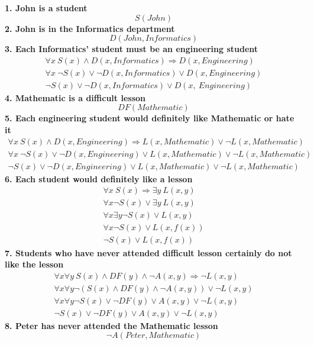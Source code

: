 \documentclass[a4paper, 12pt]{article}
\newcommand{\bd}{\textbf}
\begin{document}
\bd{1. John is a student}
$$
    S(John)
$$
\bd{2. John is in the Informatics department}
$$
    D(John, Informatics)
$$
\bd{3. Each Informatics' student must be an engineering student}
\begin{align*}
    \forall{x}\ S(x)\land D(x,Informatics)\Rightarrow D(x,Engineering)       \\
    \forall{x}\ \lnot S(x) \lor \lnot D(x,Informatics) \lor D(x,Engineering) \\
    \lnot S(x) \lor \lnot D(x,Informatics) \lor D(x,\ Engineering)
\end{align*}
\bd{4. Mathematic is a difficult lesson}
$$
    DF(Mathematic)
$$
\bd{5. Each engineering student would definitely like Mathematic or hate it}
\begin{align*}
    \forall{x}\ S(x)\land D(x,Engineering)\Rightarrow L(x,Mathematic)\lor \lnot L(x,Mathematic)        \\
    \forall{x}\ \lnot S(x) \lor \lnot D(x,Engineering) \lor L(x,Mathematic) \lor \lnot L(x,Mathematic) \\
    \lnot S(x) \lor \lnot D(x,Engineering) \lor L(x,Mathematic) \lor \lnot L(x,Mathematic)
\end{align*}
\bd{6. Each student would definitely like a lesson}
\begin{align*}
    \forall{x}\ S(x) \Rightarrow \exists{y}\ L(x, y) \\
    \forall{x}\lnot S(x) \lor \exists{y}\ L(x, y)    \\
    \forall{x}\exists{y}\lnot S(x) \lor L(x, y)      \\
    \forall{x}\lnot S(x) \lor L(x, f(x))             \\
    \lnot S(x) \lor L(x, f(x))
\end{align*}
\bd{7. Students who have never attended difficult lesson certainly do not like the lesson}
\begin{align*}
    \forall{x}\forall{y}\ S(x) \land DF(y) \land \lnot A(x, y) \Rightarrow \lnot L(x, y) \\
    \forall{x}\forall{y}\lnot(S(x) \land DF(y) \land \lnot A(x, y)) \lor \lnot L(x, y)   \\
    \forall{x}\forall{y}\lnot S(x) \lor \lnot DF(y) \lor A(x, y) \lor \lnot L(x, y)      \\
    \lnot S(x) \lor \lnot DF(y) \lor A(x, y) \lor \lnot L(x, y)
\end{align*}
\bd{8. Peter has never attended the Mathematic lesson}
$$
    \lnot A(Peter, Mathematic)
$$
\newpage
\end{document}
